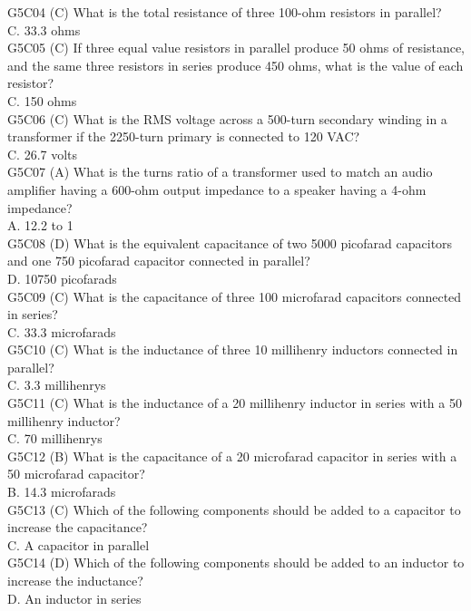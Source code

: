 \documentclass[12pt,letterpaper]{report}
\begin{document}
G5C04 (C) What is the total resistance of three 100-ohm resistors in parallel?\\
C. 33.3 ohms\\

G5C05 (C) If three equal value resistors in parallel produce 50 ohms of resistance, and the same three resistors in series produce 450 ohms, what is the value of each resistor?\\
C. 150 ohms\\

G5C06 (C) What is the RMS voltage across a 500-turn secondary winding in a transformer if the 2250-turn primary is connected to 120 VAC?\\
C. 26.7 volts\\

G5C07 (A) What is the turns ratio of a transformer used to match an audio amplifier having a 600-ohm output impedance to a speaker having a 4-ohm impedance?\\
A. 12.2 to 1\\

G5C08 (D) What is the equivalent capacitance of two 5000 picofarad capacitors and one 750 picofarad capacitor connected in parallel?\\
D. 10750 picofarads\\

G5C09 (C) What is the capacitance of three 100 microfarad capacitors connected in series?\\
C. 33.3 microfarads\\

G5C10 (C) What is the inductance of three 10 millihenry inductors connected in parallel?\\
C. 3.3 millihenrys\\

G5C11 (C) What is the inductance of a 20 millihenry inductor in series with a 50 millihenry inductor?\\
C. 70 millihenrys\\

G5C12 (B) What is the capacitance of a 20 microfarad capacitor in series with a 50 microfarad capacitor?\\
B. 14.3 microfarads\\

G5C13 (C) Which of the following components should be added to a capacitor to increase the capacitance?\\
C. A capacitor in parallel\\

G5C14 (D) Which of the following components should be added to an inductor to increase the inductance?\\
D. An inductor in series\\
\end{document}
